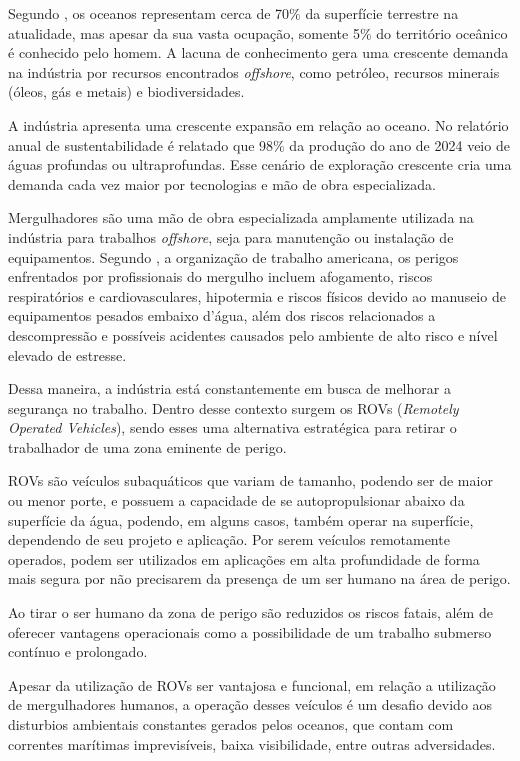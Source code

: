 \documentclass[../main.tex]{subfiles}
\begin{document}
Segundo \cite{biazon2017profundezas}, os oceanos representam cerca de 70\% da superfície terrestre na atualidade, mas apesar da sua vasta ocupação, somente 5\% do território oceânico é conhecido pelo homem. A lacuna de conhecimento gera uma crescente demanda na indústria por recursos encontrados \textit{offshore}, como petróleo, recursos minerais (óleos, gás e metais) e biodiversidades.

A indústria apresenta uma crescente expansão em relação ao oceano. No relatório anual de sustentabilidade \cite{petrobras2024} é relatado que 98\% da produção do ano de 2024 veio de águas profundas ou ultraprofundas. Esse cenário de exploração crescente cria uma demanda cada vez maior por tecnologias e mão de obra especializada.

Mergulhadores são uma mão de obra especializada amplamente utilizada na indústria para trabalhos \textit{offshore}, seja para manutenção ou instalação de equipamentos. Segundo \cite{OSHA2023}, a organização de trabalho americana, os perigos enfrentados por profissionais do mergulho incluem afogamento, riscos respiratórios e cardiovasculares, hipotermia e riscos físicos devido ao manuseio de equipamentos pesados embaixo d'água, além dos riscos relacionados a descompressão e possíveis acidentes causados pelo ambiente  de alto risco e nível elevado de estresse.

Dessa maneira, a indústria está constantemente em busca de melhorar a segurança no trabalho. Dentro desse contexto surgem os ROVs (\textit{Remotely Operated Vehicles}), sendo esses uma alternativa estratégica para retirar o trabalhador de uma zona eminente de perigo.

ROVs são veículos subaquáticos que variam de tamanho, podendo ser de maior ou menor porte, e possuem a capacidade de se autopropulsionar abaixo da superfície da água, podendo, em alguns casos, também operar na superfície, dependendo de seu projeto e aplicação. Por serem veículos remotamente operados, podem ser utilizados em aplicações em alta profundidade de forma mais segura por não precisarem da presença de um ser humano na área de perigo. 

Ao tirar o ser humano da zona de perigo são reduzidos os riscos fatais, além de oferecer vantagens operacionais como a possibilidade de um trabalho submerso contínuo e prolongado.

Apesar da utilização de ROVs ser vantajosa e funcional, em relação a utilização de mergulhadores humanos, a operação desses veículos é um desafio devido aos disturbios ambientais constantes gerados pelos oceanos, que contam com correntes marítimas imprevisíveis, baixa visibilidade, entre outras adversidades. 
\end{document}
